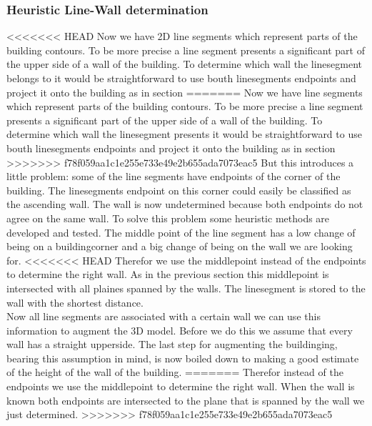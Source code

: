 \subsubsection{Heuristic Line-Wall determination}
<<<<<<< HEAD
	Now we have 2D line segments which represent parts of the building contours. To be more precise a line segment presents a significant part of the upper side of a wall of the building.
	To determine which wall the linesegment belongs to it would be straightforward to use bouth linesegments endpoints and project it onto the building as in section %
=======
	Now we have line segments which represent parts of the building contours. To be more precise a line segment presents a significant part of the upper side of a wall of the building.
	To determine which wall the linesegment presents it would be straightforward to use bouth linesegments endpoints and project it onto the building as in section %
>>>>>>> f78f059aa1c1e255e733e49e2b655ada7073eac5
	But this introduces a little problem: some of the line segments have endpoints of the corner of the building.
	The linesegments endpoint on this corner could easily be classified as the ascending wall.
	The wall is now undetermined because both endpoints do not agree on the same wall.  
	To solve this problem some heuristic methods are developed and tested.
	The middle point of the line segment has a low change of being on a buildingcorner and a big change of being on the wall we are looking for.
<<<<<<< HEAD
	Therefor we use the middlepoint instead of the endpoints to determine the right wall.
	As in the previous section %
	this middlepoint is intersected with all plaines spanned by the walls. The linesegment is stored to the wall with the shortest distance.
	\\
	Now all line segments are associated with a certain wall we can use this information to augment the 3D model.
	Before we do this we assume that every wall has a straight upperside. %
	The last step for augmenting the buildinging, bearing this assumption in mind, is now boiled down to making a good estimate of the height of the wall of the building.
=======
	Therefor instead of the endpoints we use the middlepoint to determine the right wall.
	When the wall is known both endpoints are intersected to the plane that is spanned by the wall we just determined.
>>>>>>> f78f059aa1c1e255e733e49e2b655ada7073eac5

